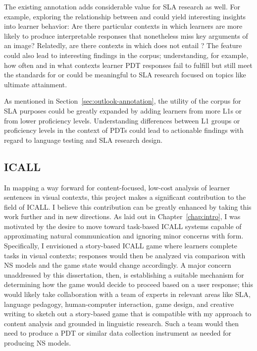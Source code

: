 The existing annotation adds considerable value for SLA research as well. For example, exploring the relationship between  and  could yield interesting insights into learner behavior: Are there particular contexts in which learners are more likely to produce interpretable responses that nonetheless miss key arguments of an image? Relatedly, are there contexts in which  does not entail ? The  feature could also lead to interesting findings in the corpus; understanding, for example, how often and in what contexts learner PDT responses fail to fulfill  but still meet the standards for  or  could be meaningful to SLA research focused on topics like ultimate attainment.

As mentioned in Section~\ref{sec:outlook-annotation}, the utility of the corpus for SLA purposes could be greatly expanded by adding learners from more L1s or from lower proficiency levels. Understanding differences between L1 groups or proficiency levels in the context of PDTs could lead to actionable findings with regard to language testing and SLA research design.

\subsection{ICALL}
\label{sec:outlook-icall}

In mapping a way forward for content-focused, low-cost analysis of learner sentences in visual contexts, this project makes a significant contribution to the field of ICALL. I believe this contribution can be greatly enhanced by taking this work further and in new directions. As laid out in Chapter~\ref{chap:intro}, I was motivated by the desire to move toward task-based ICALL systems capable of approximating natural communication and ignoring minor concerns with form. Specifically, I envisioned a story-based ICALL game where learners complete tasks in visual contexts; responses would then be analyzed via comparison with NS models and the game state would change accordingly. A major concern unaddressed by this dissertation, then, is establishing a suitable mechanism for determining how the game would decide to proceed based on a user response; this would likely take collaboration with a team of experts in relevant areas like SLA, language pedagogy, human-computer interaction, game design, and creative writing to sketch out a story-based game that is compatible with my approach to content analysis and grounded in linguistic research. Such a team would then need to produce a PDT or similar data collection instrument as needed for producing NS models.

